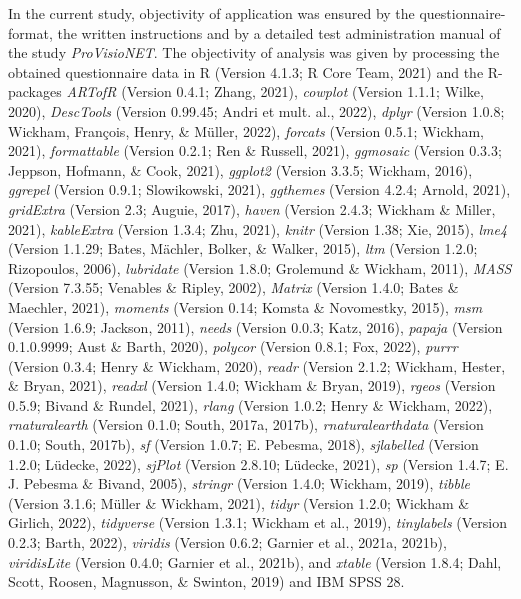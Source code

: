 \documentclass[
  man]{apa6}
\begin{document}
In the current study, objectivity of application was ensured by the questionnaire-format, the written instructions and by a detailed test administration manual of the study \emph{ProVisioNET}. The objectivity of analysis was given by processing the obtained questionnaire data in R (Version 4.1.3; R Core Team, 2021) and the R-packages \emph{ARTofR} (Version 0.4.1; Zhang, 2021), \emph{cowplot} (Version 1.1.1; Wilke, 2020), \emph{DescTools} (Version 0.99.45; Andri et mult. al., 2022), \emph{dplyr} (Version 1.0.8; Wickham, François, Henry, \& Müller, 2022), \emph{forcats} (Version 0.5.1; Wickham, 2021), \emph{formattable} (Version 0.2.1; Ren \& Russell, 2021), \emph{ggmosaic} (Version 0.3.3; Jeppson, Hofmann, \& Cook, 2021), \emph{ggplot2} (Version 3.3.5; Wickham, 2016), \emph{ggrepel} (Version 0.9.1; Slowikowski, 2021), \emph{ggthemes} (Version 4.2.4; Arnold, 2021), \emph{gridExtra} (Version 2.3; Auguie, 2017), \emph{haven} (Version 2.4.3; Wickham \& Miller, 2021), \emph{kableExtra} (Version 1.3.4; Zhu, 2021), \emph{knitr} (Version 1.38; Xie, 2015), \emph{lme4} (Version 1.1.29; Bates, Mächler, Bolker, \& Walker, 2015), \emph{ltm} (Version 1.2.0; Rizopoulos, 2006), \emph{lubridate} (Version 1.8.0; Grolemund \& Wickham, 2011), \emph{MASS} (Version 7.3.55; Venables \& Ripley, 2002), \emph{Matrix} (Version 1.4.0; Bates \& Maechler, 2021), \emph{moments} (Version 0.14; Komsta \& Novomestky, 2015), \emph{msm} (Version 1.6.9; Jackson, 2011), \emph{needs} (Version 0.0.3; Katz, 2016), \emph{papaja} (Version 0.1.0.9999; Aust \& Barth, 2020), \emph{polycor} (Version 0.8.1; Fox, 2022), \emph{purrr} (Version 0.3.4; Henry \& Wickham, 2020), \emph{readr} (Version 2.1.2; Wickham, Hester, \& Bryan, 2021), \emph{readxl} (Version 1.4.0; Wickham \& Bryan, 2019), \emph{rgeos} (Version 0.5.9; Bivand \& Rundel, 2021), \emph{rlang} (Version 1.0.2; Henry \& Wickham, 2022), \emph{rnaturalearth} (Version 0.1.0; South, 2017a, 2017b), \emph{rnaturalearthdata} (Version 0.1.0; South, 2017b), \emph{sf} (Version 1.0.7; E. Pebesma, 2018), \emph{sjlabelled} (Version 1.2.0; Lüdecke, 2022), \emph{sjPlot} (Version 2.8.10; Lüdecke, 2021), \emph{sp} (Version 1.4.7; E. J. Pebesma \& Bivand, 2005), \emph{stringr} (Version 1.4.0; Wickham, 2019), \emph{tibble} (Version 3.1.6; Müller \& Wickham, 2021), \emph{tidyr} (Version 1.2.0; Wickham \& Girlich, 2022), \emph{tidyverse} (Version 1.3.1; Wickham et al., 2019), \emph{tinylabels} (Version 0.2.3; Barth, 2022), \emph{viridis} (Version 0.6.2; Garnier et al., 2021a, 2021b), \emph{viridisLite} (Version 0.4.0; Garnier et al., 2021b), and \emph{xtable} (Version 1.8.4; Dahl, Scott, Roosen, Magnusson, \& Swinton, 2019) and IBM SPSS 28.
\end{document}
